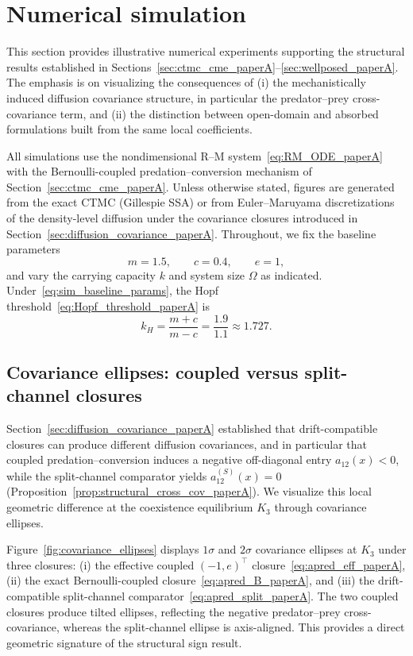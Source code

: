 \documentclass[pdflatex,sn-mathphys-ay]{sn-jnl}
\theoremstyle{thmstyleone}
\theoremstyle{definition}
\theoremstyle{remark}
\begin{document}
\section{Numerical simulation}
\label{sec:numerical_simulation}

This section provides illustrative numerical experiments supporting the structural results established in Sections~\ref{sec:ctmc_cme_paperA}--\ref{sec:wellposed_paperA}. The emphasis is on visualizing the consequences of (i) the mechanistically induced diffusion covariance structure, in particular the predator--prey cross-covariance term, and (ii) the distinction between open-domain and absorbed formulations built from the same local coefficients. 

All simulations use the nondimensional R--M system~\eqref{eq:RM_ODE_paperA} with the Bernoulli-coupled predation--conversion mechanism of Section~\ref{sec:ctmc_cme_paperA}.  Unless otherwise stated, figures are generated from the exact CTMC (Gillespie SSA) or from Euler--Maruyama discretizations of the density-level diffusion under the covariance closures introduced in Section~\ref{sec:diffusion_covariance_paperA}.
Throughout, we fix the baseline parameters
\begin{equation}
\label{eq:sim_baseline_params}
m=1.5,\qquad c=0.4,\qquad e=1,
\end{equation}
and vary the carrying capacity $k$ and system size $\Omega$ as indicated. Under~\eqref{eq:sim_baseline_params}, the Hopf threshold~\eqref{eq:Hopf_threshold_paperA} is
\[
k_H=\frac{m+c}{m-c}=\frac{1.9}{1.1}\approx 1.727.
\]

\subsection{Covariance ellipses: coupled versus split-channel closures}
\label{subsec:sim_ellipses}

Section~\ref{sec:diffusion_covariance_paperA} established that drift-compatible closures can produce different diffusion covariances, and in particular that coupled predation--conversion induces a negative off-diagonal entry $a_{12}(x)<0$, while the split-channel comparator yields $a_{12}^{(S)}(x)=0$ (Proposition~\ref{prop:structural_cross_cov_paperA}). 
We visualize this local geometric difference at the coexistence equilibrium $K_3$ through covariance ellipses.

Figure~\ref{fig:covariance_ellipses} displays $1\sigma$ and $2\sigma$ covariance ellipses at $K_3$ under three closures: (i) the effective coupled $(-1,e)^\top$ closure~\eqref{eq:apred_eff_paperA}, (ii) the exact Bernoulli-coupled closure~\eqref{eq:apred_B_paperA}, and (iii) the drift-compatible split-channel comparator~\eqref{eq:apred_split_paperA}. The two coupled closures produce tilted ellipses, reflecting the negative predator--prey cross-covariance, whereas the split-channel ellipse is axis-aligned. This provides a direct geometric signature of the structural sign result.
\end{document}
